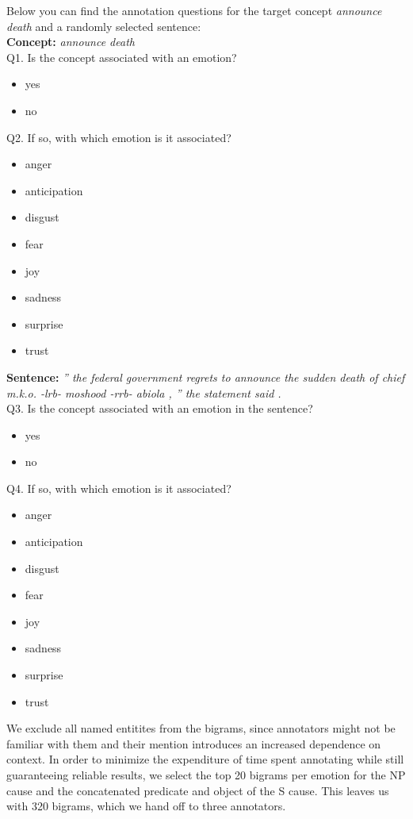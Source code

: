 Below you can find the annotation questions for the target concept \textit{announce death} and a randomly selected sentence:\\

\textbf{Concept:} \textit{announce death}\\

Q1. Is the concept associated with an emotion?
\begin{itemize}[noitemsep]
	\item yes
	\item no
\end{itemize}

Q2. If so, with which emotion is it associated?
\begin{itemize}[noitemsep]
	\item anger
	\item anticipation
	\item disgust
	\item fear
	\item joy
	\item sadness
	\item surprise
	\item trust
\end{itemize}

\textbf{Sentence:} \textit{'' the federal government regrets to announce the sudden death of chief m.k.o. -lrb- moshood -rrb- abiola , '' the statement said .}\\

Q3. Is the concept associated with an emotion in the sentence?
\begin{itemize}[noitemsep]
	\item yes
	\item no
\end{itemize}

Q4. If so, with which emotion is it associated?
\begin{itemize}[noitemsep]
	\item anger
	\item anticipation
	\item disgust
	\item fear
	\item joy
	\item sadness
	\item surprise
	\item trust
\end{itemize}

We exclude all named entitites from the bigrams, since annotators might not be familiar with them and their mention introduces an increased dependence on context.
In order to minimize the expenditure of time spent annotating while still guaranteeing reliable results, we select the top 20 bigrams per emotion for the NP cause and the concatenated predicate and object of the S cause. This leaves us with 320 bigrams, which we hand off to three annotators. 

